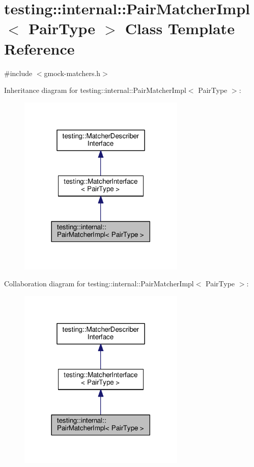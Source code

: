 \hypertarget{classtesting_1_1internal_1_1PairMatcherImpl}{}\section{testing\+:\+:internal\+:\+:Pair\+Matcher\+Impl$<$ Pair\+Type $>$ Class Template Reference}
\label{classtesting_1_1internal_1_1PairMatcherImpl}


{\ttfamily \#include $<$gmock-\/matchers.\+h$>$}



Inheritance diagram for testing\+:\+:internal\+:\+:Pair\+Matcher\+Impl$<$ Pair\+Type $>$\+:\nopagebreak
\begin{figure}[H]
\begin{center}
\leavevmode
\includegraphics[width=225pt]{classtesting_1_1internal_1_1PairMatcherImpl__inherit__graph}
\end{center}
\end{figure}


Collaboration diagram for testing\+:\+:internal\+:\+:Pair\+Matcher\+Impl$<$ Pair\+Type $>$\+:\nopagebreak
\begin{figure}[H]
\begin{center}
\leavevmode
\includegraphics[width=225pt]{classtesting_1_1internal_1_1PairMatcherImpl__coll__graph}
\end{center}
\end{figure}
